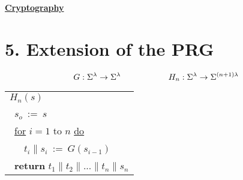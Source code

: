 \documentclass{report}
\begin{document}
\begin{center}
\huge{\textbf{\underline{Cryptography}}}
\end{center}


{\let\clearpage\relax \chapter*{5. Extension of the PRG}}
	\[
		G: \Sigma ^{\lambda} \rightarrow \Sigma ^{\lambda} \hspace{2cm}
		H_n: \Sigma ^{\lambda} \rightarrow \Sigma ^{(n+1) \lambda} \\
	\]
	\begin{tabular}{l}
		\underline{$H_n(s)$} \\
		\ $s_o \ := \ s$ \\
		\ \underline{for} $i=1$ to $n$ \underline{do} \\
		\ \ \ $t_i \| s_i \ := \ G(s_{i-1})$ \\
		\ \textbf{return} $t_1 \| t_2 \| ... \| t_n \| s_n$
	\end{tabular} \\
\end{document}
